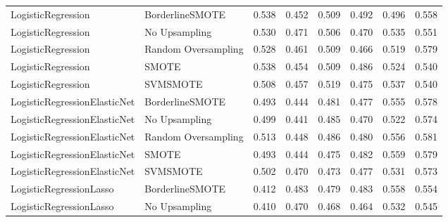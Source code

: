\begin{tabular}{llllllll}
          LogisticRegression &     BorderlineSMOTE & 0.538 &                     0.452 &                 0.509 &                  0.492 &                                   0.496 &     0.558 \\
          LogisticRegression &       No Upsampling & 0.530 &                     0.471 &                 0.506 &                  0.470 &                                   0.535 &     0.551 \\
          LogisticRegression & Random Oversampling & 0.528 &                     0.461 &                 0.509 &                  0.466 &                                   0.519 &     0.579 \\
          LogisticRegression &               SMOTE & 0.538 &                     0.454 &                 0.509 &                  0.486 &                                   0.524 &     0.540 \\
          LogisticRegression &            SVMSMOTE & 0.508 &                     0.457 &                 0.519 &                  0.475 &                                   0.537 &     0.540 \\
LogisticRegressionElasticNet &     BorderlineSMOTE & 0.493 &                     0.444 &                 0.481 &                  0.477 &                                   0.555 &     0.578 \\
LogisticRegressionElasticNet &       No Upsampling & 0.499 &                     0.441 &                 0.485 &                  0.470 &                                   0.522 &     0.574 \\
LogisticRegressionElasticNet & Random Oversampling & 0.513 &                     0.448 &                 0.486 &                  0.480 &                                   0.556 &     0.581 \\
LogisticRegressionElasticNet &               SMOTE & 0.493 &                     0.444 &                 0.475 &                  0.482 &                                   0.559 &     0.579 \\
LogisticRegressionElasticNet &            SVMSMOTE & 0.502 &                     0.470 &                 0.473 &                  0.477 &                                   0.531 &     0.573 \\
     LogisticRegressionLasso &     BorderlineSMOTE & 0.412 &                     0.483 &                 0.479 &                  0.483 &                                   0.558 &     0.554 \\
     LogisticRegressionLasso &       No Upsampling & 0.410 &                     0.470 &                 0.468 &                  0.464 &                                   0.532 &     0.545 \\

\end{tabular}
